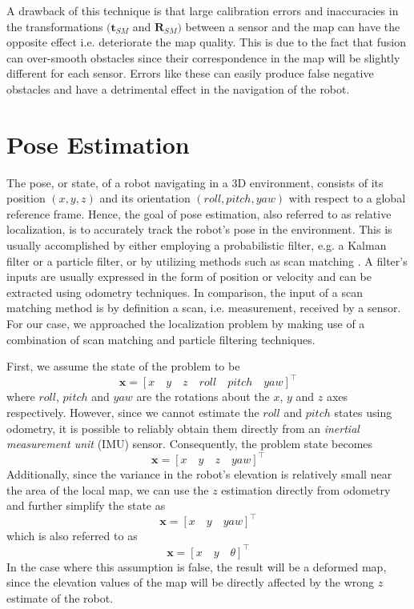 A drawback of this technique is that large calibration errors and inaccuracies
in the transformations $(\mathbf{t}_{SM}$ and $\mathbf{R}_{SM})$ between a
sensor and the map can have the opposite effect i.e. deteriorate the map
quality.
This is due to the fact that fusion can over-smooth obstacles
since their correspondence in the map will be slightly different
for each sensor.
Errors like these can easily produce false negative obstacles and
have a detrimental effect in the navigation of the robot.

\section{Pose Estimation} \label{pose_estimation}

The pose, or state, of a robot navigating in a 3D environment, consists of
its position $(x, y, z)$ and its orientation $(roll, pitch, yaw)$
with respect to a global reference frame.
Hence, the goal of pose estimation, also referred to as relative localization,
is to accurately track the robot's pose in the environment.
This is usually accomplished by either employing a probabilistic filter,
e.g. a Kalman filter or a particle filter, or by utilizing methods such
as scan matching \parencite{Fox2001}.
A filter's inputs are usually expressed in the form of position or velocity
and can be extracted using odometry techniques.
In comparison, the input of a scan matching method is by definition a
scan, i.e. measurement, received by a sensor.
For our case, we approached the localization problem by making use of a
combination of scan matching and particle filtering techniques.

First, we assume the state of the problem to be
\begin{equation}
    \mathbf{x} =
    {[x \quad y \quad z \quad roll \quad pitch \quad yaw]}^\intercal
\end{equation}
where $roll$, $pitch$ and $yaw$ are the rotations about the $x$, $y$ and $z$
axes respectively.
However, since we cannot estimate the $roll$ and $pitch$ states
using odometry, it is possible to reliably obtain them directly from an
\textit{inertial measurement unit} (IMU) sensor.
Consequently, the problem state becomes
\begin{equation}
    \mathbf{x} = {[x \quad y \quad z \quad yaw]}^\intercal
\end{equation}
Additionally, since the variance in the robot's elevation is relatively
small near the area of the local map, we can use the $z$ estimation directly
from odometry and further simplify the state as
\begin{equation}
    \mathbf{x} = {[x \quad y \quad yaw]}^\intercal
\end{equation}
which is also referred to as
\begin{equation}
    \mathbf{x} = {[x \quad y \quad \theta]}^\intercal
\end{equation}
In the case where this assumption is false, the result will be a deformed
map, since the elevation values of the map will be directly affected
by the wrong $z$ estimate of the robot.

